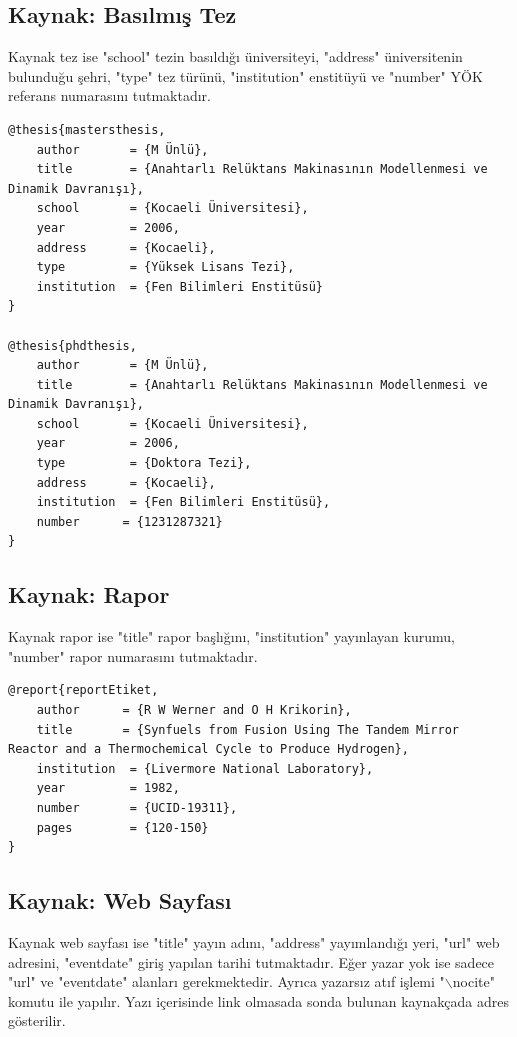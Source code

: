 \subsection{Kaynak: Basılmış Tez}

Kaynak tez ise "school" tezin basıldığı üniversiteyi, "address" üniversitenin bulunduğu şehri, "type" tez türünü, "institution" enstitüyü ve "number" YÖK referans numarasını tutmaktadır.

\begin{lstlisting}[language={[LaTeX]{TeX}}, label=bib:thesis, caption=Kaynak basılmış tez ise]
@thesis{mastersthesis,
	author       = {M Ünlü}, 
	title        = {Anahtarlı Relüktans Makinasının Modellenmesi ve Dinamik	Davranışı},
	school       = {Kocaeli Üniversitesi},
	year         = 2006,
	address      = {Kocaeli},
	type		 = {Yüksek Lisans Tezi},
	institution  = {Fen Bilimleri Enstitüsü}
}

@thesis{phdthesis,
	author       = {M Ünlü}, 
	title        = {Anahtarlı Relüktans Makinasının Modellenmesi ve Dinamik	Davranışı},
	school       = {Kocaeli Üniversitesi},
	year         = 2006,
	type		 = {Doktora Tezi},
	address      = {Kocaeli},
	institution  = {Fen Bilimleri Enstitüsü},
	number		= {1231287321}
}
\end{lstlisting}


\subsection{Kaynak: Rapor}

Kaynak rapor ise "title" rapor başlığını, "institution" yayınlayan kurumu, "number" rapor numarasını tutmaktadır.

\begin{lstlisting}[language={[LaTeX]{TeX}}, label=bib:report, caption=Kaynak rapor ise]
@report{reportEtiket,
	author 		= {R W Werner and O H Krikorin},
	title 		= {Synfuels from Fusion Using The Tandem Mirror Reactor and a Thermochemical Cycle to Produce Hydrogen},
	institution  = {Livermore National Laboratory},
	year         = 1982,
	number       = {UCID-19311},
	pages		 = {120-150}
}
\end{lstlisting}

\subsection{Kaynak: Web Sayfası}

Kaynak web sayfası ise "title" yayın adını, "address" yayımlandığı yeri, "url" web adresini, "eventdate" giriş yapılan tarihi tutmaktadır. Eğer yazar yok ise sadece "url" ve "eventdate" alanları gerekmektedir. Ayrıca yazarsız atıf işlemi "$\backslash$nocite" komutu ile yapılır. Yazı içerisinde link olmasada sonda bulunan kaynakçada adres gösterilir.


